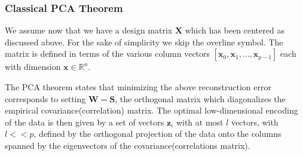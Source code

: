 \documentclass{beamer}
\begin{document}
\begin{frame}
\frametitle{Classical PCA Theorem}

We assume now that we have a design matrix $\bm{X}$ which has been
centered as discussed above. For the sake of simplicity we skip the
overline symbol. The matrix is defined in terms of the various column
vectors $[\bm{x}_0,\bm{x}_1,\dots, \bm{x}_{p-1}]$ each with dimension
$\bm{x}\in {\mathbb{R}}^{n}$.

The PCA theorem states that minimizing the above reconstruction error
corresponds to setting $\bm{W}=\bm{S}$, the orthogonal matrix which
diagonalizes the empirical covariance(correlation) matrix. The optimal
low-dimensional encoding of the data is then given by a set of vectors
$\bm{z}_i$ with at most $l$ vectors, with $l << p$, defined by the
orthogonal projection of the data onto the columns spanned by the
eigenvectors of the covariance(correlations matrix).
\end{frame}
\end{document}
